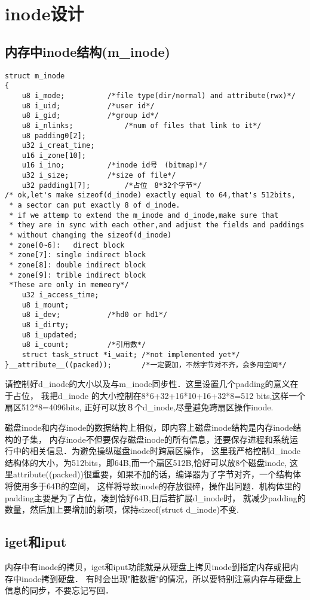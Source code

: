 \section{inode设计}
\subsection{内存中inode结构(m\_inode)}
\begin{verbatim}   
struct m_inode
{
	u8 i_mode;			/*file type(dir/normal) and attribute(rwx)*/
	u8 i_uid;			/*user id*/
	u8 i_gid;			/*group id*/
	u8 i_nlinks;			/*num of files that link to it*/
	u8 padding0[2];
	u32 i_creat_time;	
	u16 i_zone[10];
	u16 i_ino;			/*inode id号　(bitmap)*/
	u32 i_size;			/*size of file*/
	u32 padding1[7];		/*占位　8*32个字节*/
/* ok,let's make sizeof(d_inode) exactly equal to 64,that's 512bits,
 * a sector can put exactly 8 of d_inode.
 * if we attemp to extend the m_inode and d_inode,make sure that
 * they are in sync with each other,and adjust the fields and paddings
 * without changing the sizeof(d_inode)
 * zone[0~6]:	direct block 
 * zone[7]:	single indirect block
 * zone[8]:	double indirect block 
 * zone[9]:	trible indirect block
 *These are only in memeory*/
	u32 i_access_time;
	u8 i_mount;
	u8 i_dev;			/*hd0 or hd1*/
	u8 i_dirty;
	u8 i_updated;
	u8 i_count;			/*引用数*/
	struct task_struct *i_wait;	/*not implemented yet*/
}__attribute__((packed));		/*一定要加，不然字节对不齐，会多用空间*/
\end{verbatim}

请控制好d\_inode的大小以及与m\_inode同步性．这里设置几个padding的意义在于占位，
我把d\_inode 的大小控制在8*6+32+16*10+16+32*8=512 bits,这样一个扇区512*8=4096bits,
正好可以放８个d\_inode,尽量避免跨扇区操作inode.

磁盘inode和内存inode的数据结构上相似，即内容上磁盘inode结构是内存inode结构的子集，
内存inode不但要保存磁盘inode的所有信息，还要保存进程和系统运行中的相关信息．为避免操纵磁盘inode时跨扇区操作，
这里我严格控制d\_inode结构体的大小，为512bits，即64B,而一个扇区512B,恰好可以放8个磁盘inode,
这里attribute((packed))很重要，如果不加的话，编译器为了字节对齐，一个结构体将使用多于64B的空间，
这样将导致inode的存放很碎，操作出问题．机构体里的padding主要是为了占位，凑到恰好64B,日后若扩展d\_inode时，
就减少padding的数量，然后加上要增加的新项，保持sizeof(struct d\_inode)不变.

\subsection{iget和iput}
内存中有inode的拷贝，iget和iput功能就是从硬盘上拷贝inode到指定内存或把内存中inode拷到硬盘．
有时会出现"脏数据"的情况，所以要特别注意内存与硬盘上信息的同步，不要忘记写回．

